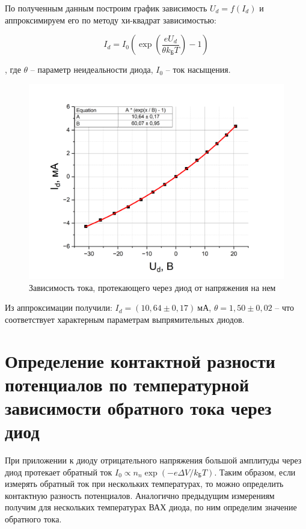 \documentclass[a4paper,12pt]{article}
\begin{document}
По полученным данным построим график зависимость $U_d = f(I_d)$ и аппроксимируем его по методу хи-квадрат зависимостью:

$$
	I_d = I_0 \left( \exp \left( \frac{eU_d}{\theta k_Б T} \right) - 1 \right)
$$

, где $\theta$ -- параметр неидеальности диода, $I_0$ -- ток насыщения.


\begin{figure}[h!]
	\centering
	\includegraphics[width=\linewidth]{volt_amper_diod}
	\caption{Зависимость тока, протекающего через диод от напряжения на нем}
\end{figure}

Из аппроксимации получили: $I_d = (10,64 \pm 0,17) \ мА$, $\theta = 1,50 \pm 0,02$ -- что соответствует характерным параметрам выпрямительных диодов.

\newpage

\section*{Определение контактной разности потенциалов по температурной зависимости обратного тока через диод}

При приложении к диоду отрицательного напряжения большой амплитуды через диод протекает обратный ток $I_0 \propto n_n \exp(-e \Delta V / k_Б T)$. Таким образом, если измерять обратный ток при нескольких температурах, то можно определить контактную разность потенциалов. Аналогично предыдущим измерениям получим для нескольких температурах ВАХ диода, по ним определим значение обратного тока.
\end{document}
